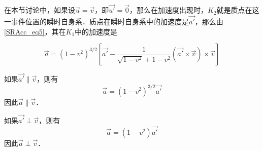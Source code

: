 在本节讨论中，如果设$\vec{u}=\vec{v}$，即$\vec{u'}=\vec{0}$，那么在加速度出现时，$K_2$就是质点在这一事件位置的瞬时自身系．质点在瞬时自身系中的加速度是$\vec{a'}$，那么由\autoref{SRAcc_eq5}，其在$K_1$中的加速度是

\begin{equation}
\vec{a}=(1-v^2)^{3/2}[\vec{a'}-\frac{1}{\sqrt{1-v^2}+1-v^2}(\vec{a'}\times\vec{v})\times\vec{v}]
\end{equation}

如果$\vec{a'}\parallel \vec{v}$，则有$$\vec{a}=(1-v^2)^{3/2}\vec{a'}$$因此$\vec{a}\parallel\vec{v}$．

如果$\vec{a'}\perp \vec{v}$，则有$$\vec{a}=(1-v^2)\vec{a'}$$因此$\vec{a}\perp\vec{v}$．


